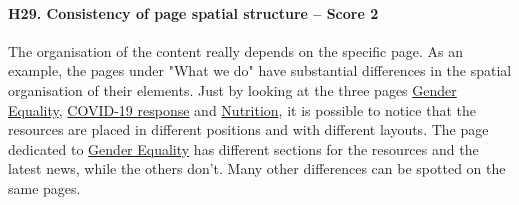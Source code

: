 \paragraph*{H29. Consistency of page spatial structure  – Score 2}
The organisation of the content really depends on the specific page. As an example, the pages under "What we do" have substantial differences in the spatial organisation of their elements. Just by looking at the three pages \href{https://www.unicef.org/gender-equality}{Gender Equality}, \href{https://www.unicef.org/coronavirus/covid-19}{COVID-19 response} and \href{https://www.unicef.org/nutrition}{Nutrition}, it is possible to notice that the resources are placed in different positions and with different layouts. The page dedicated to \href{https://www.unicef.org/gender-equality}{Gender Equality} has different sections for the resources and the latest news, while the others don't. Many other differences can be spotted on the same pages.
